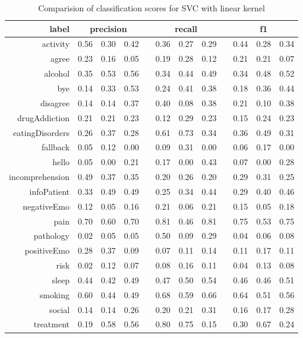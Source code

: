 \documentclass[11pt]{article}
\begin{document}
\begin{table}[htb]
\begin{center}
\begin{tabular}{ |r|c|c|c|l|c|c|c|l|c|c|c| }
\hline
label 			& \multicolumn{3}{c|}{precision} && \multicolumn{3}{c|}{recall} && \multicolumn{3}{c|}{f1} \\ \hline 
activity 		&  0.56 & 0.30 & 0.42 && 0.36 & 0.27 & 0.29 && 0.44 & 0.28 & 0.34 \\ \hline 
agree 			&  0.23 & 0.16 & 0.05 && 0.19 & 0.28 & 0.12 && 0.21 & 0.21 & 0.07 \\ \hline 
alcohol 		&  0.35 & 0.53 & 0.56 && 0.34 & 0.44 & 0.49 && 0.34 & 0.48 & 0.52 \\ \hline 
bye 			&  0.14 & 0.33 & 0.53 && 0.24 & 0.41 & 0.38 && 0.18 & 0.36 & 0.44 \\ \hline 
disagree 		&  0.14 & 0.14 & 0.37 && 0.40 & 0.08 & 0.38 && 0.21 & 0.10 & 0.38 \\ \hline 
drugAddiction 	&  0.21 & 0.21 & 0.23 && 0.12 & 0.29 & 0.23 && 0.15 & 0.24 & 0.23 \\ \hline 
eatingDisorders &  0.26 & 0.37 & 0.28 && 0.61 & 0.73 & 0.34 && 0.36 & 0.49 & 0.31 \\ \hline 
fallback 		&  0.05 & 0.12 & 0.00 && 0.09 & 0.31 & 0.00 && 0.06 & 0.17 & 0.00 \\ \hline 
hello 			&  0.05 & 0.00 & 0.21 && 0.17 & 0.00 & 0.43 && 0.07 & 0.00 & 0.28 \\ \hline 
incomprehension &  0.49 & 0.37 & 0.35 && 0.20 & 0.26 & 0.20 && 0.29 & 0.31 & 0.25 \\ \hline 
infoPatient 	&  0.33 & 0.49 & 0.49 && 0.25 & 0.34 & 0.44 && 0.29 & 0.40 & 0.46 \\ \hline 
negativeEmo 	&  0.12 & 0.05 & 0.16 && 0.21 & 0.06 & 0.21 && 0.15 & 0.05 & 0.18 \\ \hline 
pain 			&  0.70 & 0.60 & 0.70 && 0.81 & 0.46 & 0.81 && 0.75 & 0.53 & 0.75 \\ \hline 
pathology 		&  0.02 & 0.05 & 0.05 && 0.50 & 0.09 & 0.29 && 0.04 & 0.06 & 0.08 \\ \hline 
positiveEmo 	&  0.28 & 0.37 & 0.09 && 0.07 & 0.11 & 0.14 && 0.11 & 0.17 & 0.11 \\ \hline 
risk 			&  0.02 & 0.12 & 0.07 && 0.08 & 0.16 & 0.11 && 0.04 & 0.13 & 0.08 \\ \hline 
sleep 			&  0.44 & 0.42 & 0.49 && 0.47 & 0.50 & 0.54 && 0.46 & 0.46 & 0.51 \\ \hline 
smoking 		&  0.60 & 0.44 & 0.49 && 0.68 & 0.59 & 0.66 && 0.64 & 0.51 & 0.56 \\ \hline 
social 			&  0.14 & 0.14 & 0.26 && 0.20 & 0.21 & 0.31 && 0.16 & 0.17 & 0.28 \\ \hline 
treatment		&  0.19 & 0.58 & 0.56 && 0.80 & 0.75 & 0.15 && 0.30 & 0.67 & 0.24 \\ \hline 
\end{tabular}
\caption{Comparision of classification scores for SVC with linear kernel}
\end{center}
\end{table}
\FloatBarrier
\end{document}
